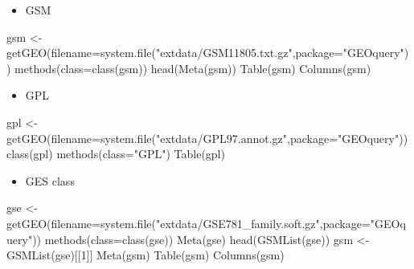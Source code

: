 \documentclass[
]{book}
\newenvironment{Shaded}{\begin{snugshade}}{\end{snugshade}}
\newcommand{\AttributeTok}[1]{\textcolor[rgb]{0.77,0.63,0.00}{#1}}
\newcommand{\DecValTok}[1]{\textcolor[rgb]{0.00,0.00,0.81}{#1}}
\newcommand{\FunctionTok}[1]{\textcolor[rgb]{0.00,0.00,0.00}{#1}}
\newcommand{\NormalTok}[1]{#1}
\newcommand{\OtherTok}[1]{\textcolor[rgb]{0.56,0.35,0.01}{#1}}
\newcommand{\StringTok}[1]{\textcolor[rgb]{0.31,0.60,0.02}{#1}}
\providecommand{\tightlist}{%
  \setlength{\itemsep}{0pt}\setlength{\parskip}{0pt}}
\begin{document}
\begin{itemize}
\tightlist
\item
  GSM
\end{itemize}

\begin{Shaded}
\begin{Highlighting}[]
\NormalTok{gsm }\OtherTok{\textless{}{-}} \FunctionTok{getGEO}\NormalTok{(}\AttributeTok{filename=}\FunctionTok{system.file}\NormalTok{(}\StringTok{"extdata/GSM11805.txt.gz"}\NormalTok{,}\AttributeTok{package=}\StringTok{"GEOquery"}\NormalTok{))}
\FunctionTok{methods}\NormalTok{(}\AttributeTok{class=}\FunctionTok{class}\NormalTok{(gsm))}
\FunctionTok{head}\NormalTok{(}\FunctionTok{Meta}\NormalTok{(gsm))}
\FunctionTok{Table}\NormalTok{(gsm)}
\FunctionTok{Columns}\NormalTok{(gsm)}
\end{Highlighting}
\end{Shaded}

\begin{itemize}
\tightlist
\item
  GPL
\end{itemize}

\begin{Shaded}
\begin{Highlighting}[]

\NormalTok{gpl }\OtherTok{\textless{}{-}} \FunctionTok{getGEO}\NormalTok{(}\AttributeTok{filename=}\FunctionTok{system.file}\NormalTok{(}\StringTok{"extdata/GPL97.annot.gz"}\NormalTok{,}\AttributeTok{package=}\StringTok{"GEOquery"}\NormalTok{))}
\FunctionTok{class}\NormalTok{(gpl)}
\FunctionTok{methods}\NormalTok{(}\AttributeTok{class=}\StringTok{"GPL"}\NormalTok{)}
\FunctionTok{Table}\NormalTok{(gpl)}
\end{Highlighting}
\end{Shaded}

\begin{itemize}
\tightlist
\item
  GES class
\end{itemize}

\begin{Shaded}
\begin{Highlighting}[]
\NormalTok{gse }\OtherTok{\textless{}{-}} \FunctionTok{getGEO}\NormalTok{(}\AttributeTok{filename=}\FunctionTok{system.file}\NormalTok{(}\StringTok{"extdata/GSE781\_family.soft.gz"}\NormalTok{,}\AttributeTok{package=}\StringTok{"GEOquery"}\NormalTok{))}
\FunctionTok{methods}\NormalTok{(}\AttributeTok{class=}\FunctionTok{class}\NormalTok{(gse))}
\FunctionTok{Meta}\NormalTok{(gse)}
\FunctionTok{head}\NormalTok{(}\FunctionTok{GSMList}\NormalTok{(gse))}
\NormalTok{gsm }\OtherTok{\textless{}{-}} \FunctionTok{GSMList}\NormalTok{(gse)[[}\DecValTok{1}\NormalTok{]]}
\FunctionTok{Meta}\NormalTok{(gsm)}
\FunctionTok{Table}\NormalTok{(gsm)}
\FunctionTok{Columns}\NormalTok{(gsm)}
\end{Highlighting}
\end{Shaded}
\end{document}
